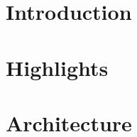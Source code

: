 \documentclass[conference]{IEEEtran}
\begin{document}
\section{Introduction}
\label{sec:intro}


\section{Highlights}
\label{sec:highlights}


\section{Architecture}
\label{sec:arch} 

%
%
%
%
%
%
%
%
%
%




\end{document}
